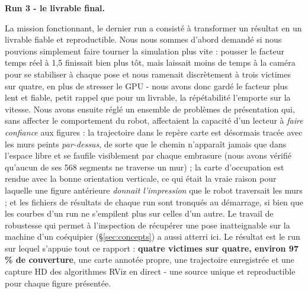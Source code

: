 \documentclass[11pt,a4paper]{article}
\newcommand{\head}[1]{\par\smallskip\noindent\textbf{\color{nccblue}#1}\par}
\begin{document}
\head{Run 3 - le livrable final.} La mission fonctionnant, le dernier run a consisté à transformer un
résultat en un livrable fiable et reproductible. Nous nous sommes d'abord demandé si nous pouvions
simplement faire tourner la simulation plus vite : pousser le facteur temps réel à 1,5 finissait bien
plus tôt, mais laissait moins de temps à la caméra pour se stabiliser à chaque pose et nous ramenait
discrètement à trois victimes sur quatre, en plus de stresser le GPU - nous avons donc gardé le facteur
plus lent et fiable, petit rappel que pour un livrable, la répétabilité l'emporte sur la vitesse. Nous
avons ensuite réglé un ensemble de problèmes de présentation qui, sans affecter le comportement du robot,
affectaient la capacité d'un lecteur à \emph{faire confiance} aux figures : la trajectoire dans le repère
carte est désormais tracée avec les murs peints \emph{par-dessus}, de sorte que le chemin n'apparaît
jamais que dans l'espace libre et se faufile visiblement par chaque embrasure (nous avons vérifié qu'aucun
de ses 568 segments ne traverse un mur) ; la carte d'occupation est rendue avec la bonne orientation
verticale, ce qui était la vraie raison pour laquelle une figure antérieure \emph{donnait l'impression}
que le robot traversait les murs ; et les fichiers de résultats de chaque run sont tronqués au démarrage,
si bien que les courbes d'un run ne s'empilent plus sur celles d'un autre. Le travail de robustesse qui
permet à l'inspection de récupérer une pose inatteignable sur la machine d'un coéquipier
(\S\ref{sec:concepts}) a aussi atterri ici. Le résultat est le run sur lequel s'appuie tout ce rapport :
\textbf{quatre victimes sur quatre, environ 97\,\% de couverture}, une carte annotée propre, une
trajectoire enregistrée et une capture HD des algorithmes RViz en direct - une source unique et
reproductible pour chaque figure présentée.
\end{document}

